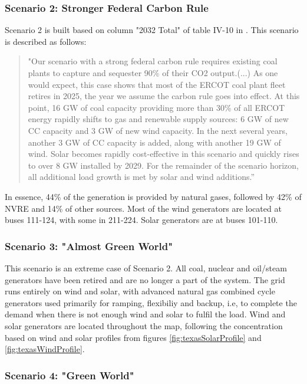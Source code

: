 \documentclass[12pt,LUDisStyle,twosided]{book}
\begin{document}
\subsubsection{Scenario 2: Stronger Federal Carbon Rule}

Scenario 2 is built based on column "2032 Total" of table IV-10 in \cite{shavel}. This scenario is described as follows:

\begin{quotation}
"Our scenario with a strong federal carbon rule requires existing coal plants to capture and sequester 90\% of their CO2 output.(...)
As one would expect, this case shows that most of the ERCOT coal plant fleet retires in 2025, the year we assume the carbon rule goes into effect. At this point, 16 GW of coal capacity providing more than 30\% of all ERCOT energy rapidly shifts to gas and renewable supply sources: 6 GW of new CC capacity and 3 GW of new wind capacity. In the next several years, another 3 GW of CC capacity is added, along with another 19 GW of wind. Solar becomes rapidly cost-effective in this scenario and quickly rises to over 8 GW installed by 2029. For the remainder of the scenario horizon, all additional load growth is met by solar and wind additions.”
\end{quotation}

In essence, 44\% of the generation is provided by natural gases, followed by 42\% of NVRE and 14\% of other sources. Most of the wind generators are located at buses 111-124, with some in 211-224. Solar generators are at buses 101-110.


\subsubsection{Scenario 3: "Almost Green World"}

This scenario is an extreme case of Scenario 2. All coal, nuclear and oil/steam generators have been retired and are no longer a part of the system. The grid runs entirely on wind and solar, with advanced natural gas combined cycle generators used primarily for ramping, flexibiliy and backup, i.e, to complete the demand when there is not enough wind and solar to fulfil the load. Wind and solar generators are located throughout the map, following the concentration based on wind and solar profiles from figures \ref{fig:texasSolarProfile} and \ref{fig:texasWindProfile}.

\subsubsection{Scenario 4: "Green World"}
\end{document}

